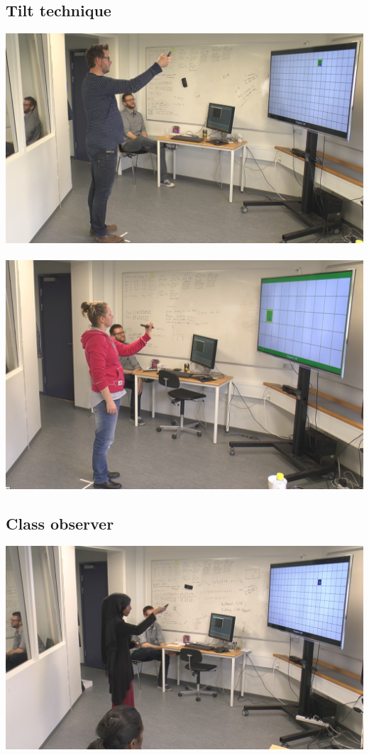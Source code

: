 \subsection*{Tilt technique}
\includegraphics[width=\textwidth]{docs/appendix/files/tilt_push.png}
\\\\
\includegraphics[width=\textwidth]{docs/appendix/files/tilt_pull.png}

\subsection*{Class observer}
\includegraphics[width=\textwidth]{docs/appendix/files/class_observer.png}
